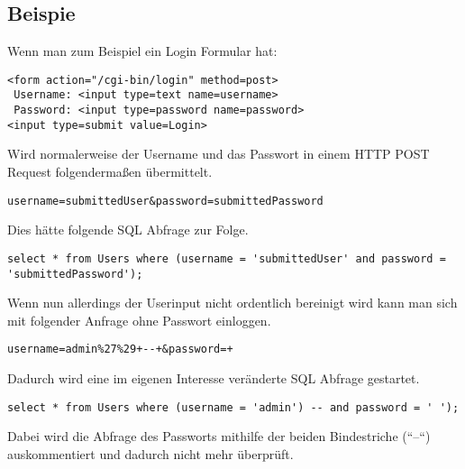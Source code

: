 \clearpage
\subsection{Beispie}
Wenn man zum Beispiel ein Login Formular hat:

\begin{lstlisting}[caption = Login Formular]
<form action="/cgi-bin/login" method=post>
 Username: <input type=text name=username> 
 Password: <input type=password name=password> 
<input type=submit value=Login>
\end{lstlisting}

Wird normalerweise der Username und das Passwort in einem HTTP POST Request folgenderma{\ss}en \"ubermittelt.

\begin{lstlisting}[caption = Normaler HTTP POST Request]
username=submittedUser&password=submittedPassword
\end{lstlisting}

Dies h\"atte folgende SQL Abfrage zur Folge.

\begin{lstlisting}[caption = Normale SQL Query]
select * from Users where (username = 'submittedUser' and password = 'submittedPassword');
\end{lstlisting}

Wenn nun allerdings der Userinput nicht ordentlich bereinigt wird kann man sich mit folgender Anfrage ohne Passwort einloggen.

\begin{lstlisting}[caption = Modifizierter HTTP POST Request]
username=admin%27%29+--+&password=+
\end{lstlisting}

Dadurch wird eine im eigenen Interesse ver\"anderte SQL Abfrage gestartet.

\begin{lstlisting}[caption = Modifizierte SQL Query]
select * from Users where (username = 'admin') -- and password = ' ');
\end{lstlisting}

Dabei wird die Abfrage des Passworts mithilfe der beiden Bindestriche (``--``) auskommentiert und dadurch nicht mehr \"uberpr\"uft.

\cite{ciscoSQLInjection}